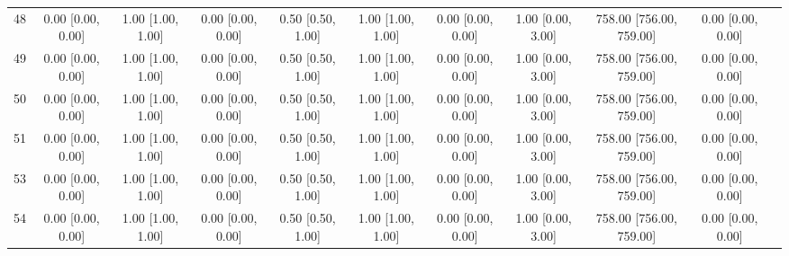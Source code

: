 \documentclass[8pt]{article}
\begin{document}
\begin{center}
\begin{footnotesize}
\begin{longtable}{|ccccccccccc|}
 48 &  0.00 [0.00, 0.00] &  1.00 [1.00, 1.00] &  0.00 [0.00, 0.00] &  0.50 [0.50, 1.00] &  1.00 [1.00, 1.00] &  0.00 [0.00, 0.00] &  1.00 [0.00, 3.00] &  758.00 [756.00, 759.00] &     0.00 [0.00, 0.00] \\
 49 &  0.00 [0.00, 0.00] &  1.00 [1.00, 1.00] &  0.00 [0.00, 0.00] &  0.50 [0.50, 1.00] &  1.00 [1.00, 1.00] &  0.00 [0.00, 0.00] &  1.00 [0.00, 3.00] &  758.00 [756.00, 759.00] &     0.00 [0.00, 0.00] \\
 50 &  0.00 [0.00, 0.00] &  1.00 [1.00, 1.00] &  0.00 [0.00, 0.00] &  0.50 [0.50, 1.00] &  1.00 [1.00, 1.00] &  0.00 [0.00, 0.00] &  1.00 [0.00, 3.00] &  758.00 [756.00, 759.00] &     0.00 [0.00, 0.00] \\
 51 &  0.00 [0.00, 0.00] &  1.00 [1.00, 1.00] &  0.00 [0.00, 0.00] &  0.50 [0.50, 1.00] &  1.00 [1.00, 1.00] &  0.00 [0.00, 0.00] &  1.00 [0.00, 3.00] &  758.00 [756.00, 759.00] &     0.00 [0.00, 0.00] \\
 53 &  0.00 [0.00, 0.00] &  1.00 [1.00, 1.00] &  0.00 [0.00, 0.00] &  0.50 [0.50, 1.00] &  1.00 [1.00, 1.00] &  0.00 [0.00, 0.00] &  1.00 [0.00, 3.00] &  758.00 [756.00, 759.00] &     0.00 [0.00, 0.00] \\
 54 &  0.00 [0.00, 0.00] &  1.00 [1.00, 1.00] &  0.00 [0.00, 0.00] &  0.50 [0.50, 1.00] &  1.00 [1.00, 1.00] &  0.00 [0.00, 0.00] &  1.00 [0.00, 3.00] &  758.00 [756.00, 759.00] &     0.00 [0.00, 0.00] \\
\end{longtable}
\end{footnotesize}
\end{center}
\end{document}
